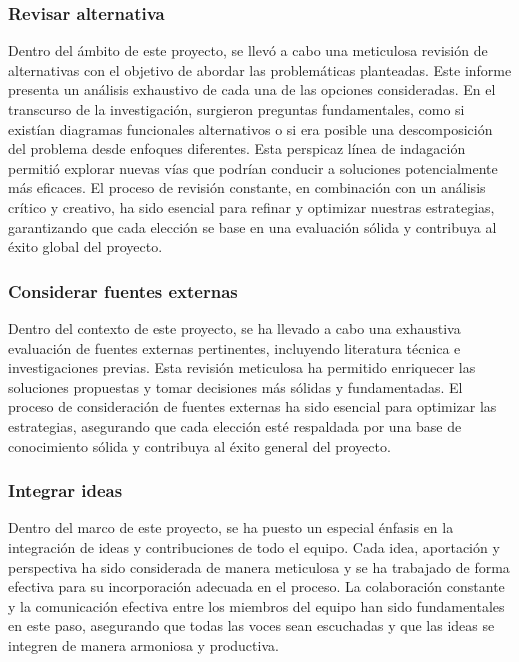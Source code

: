 \subsubsection{Revisar alternativa}
    Dentro del ámbito de este proyecto, se llevó a cabo una meticulosa revisión de alternativas con el objetivo de abordar las problemáticas planteadas. Este informe presenta un análisis exhaustivo de cada una de las opciones consideradas. En el transcurso de la investigación, surgieron preguntas fundamentales, como si existían diagramas funcionales alternativos o si era posible una descomposición del problema desde enfoques diferentes. Esta perspicaz línea de indagación permitió explorar nuevas vías que podrían conducir a soluciones potencialmente más eficaces. El proceso de revisión constante, en combinación con un análisis crítico y creativo, ha sido esencial para refinar y optimizar nuestras estrategias, garantizando que cada elección se base en una evaluación sólida y contribuya al éxito global del proyecto.
\subsubsection{Considerar fuentes externas}
    Dentro del contexto de este proyecto, se ha llevado a cabo una exhaustiva evaluación de fuentes externas pertinentes, incluyendo literatura técnica e investigaciones previas. Esta revisión meticulosa ha permitido enriquecer las soluciones propuestas y tomar decisiones más sólidas y fundamentadas. El proceso de consideración de fuentes externas ha sido esencial para optimizar las estrategias, asegurando que cada elección esté respaldada por una base de conocimiento sólida y contribuya al éxito general del proyecto.
\subsubsection{Integrar ideas}
    Dentro del marco de este proyecto, se ha puesto un especial énfasis en la integración de ideas y contribuciones de todo el equipo. Cada idea, aportación y perspectiva ha sido considerada de manera meticulosa y se ha trabajado de forma efectiva para su incorporación adecuada en el proceso. La colaboración constante y la comunicación efectiva entre los miembros del equipo han sido fundamentales en este paso, asegurando que todas las voces sean escuchadas y que las ideas se integren de manera armoniosa y productiva.